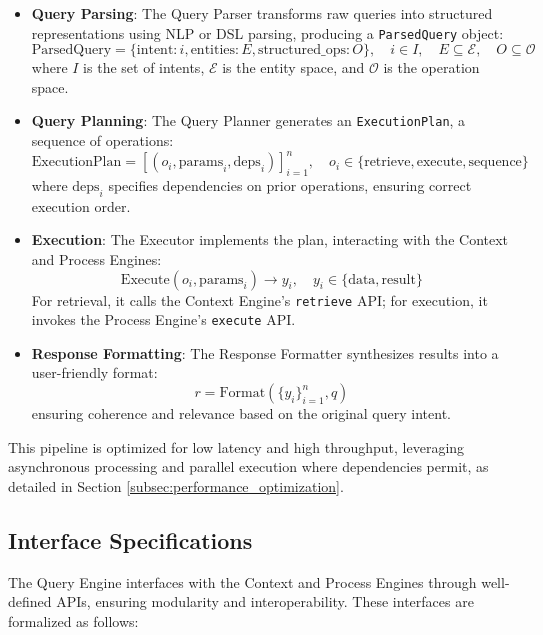 \documentclass[11pt]{article}
\begin{document}
\begin{itemize}
    \item \textbf{Query Parsing}: The Query Parser transforms raw queries into structured representations using NLP or DSL parsing, producing a \texttt{ParsedQuery} object:
        \[
        \text{ParsedQuery} = \{ \text{intent}: i, \text{entities}: E, \text{structured\_ops}: O \}, \quad i \in I, \quad E \subseteq \mathcal{E}, \quad O \subseteq \mathcal{O}
        \]
        where \( I \) is the set of intents, \( \mathcal{E} \) is the entity space, and \( \mathcal{O} \) is the operation space.

    \item \textbf{Query Planning}: The Query Planner generates an \texttt{ExecutionPlan}, a sequence of operations:
        \[
        \text{ExecutionPlan} = [ (o_i, \text{params}_i, \text{deps}_i) ]_{i=1}^n, \quad o_i \in \{ \text{retrieve}, \text{execute}, \text{sequence} \}
        \]
        where \( \text{deps}_i \) specifies dependencies on prior operations, ensuring correct execution order.

    \item \textbf{Execution}: The Executor implements the plan, interacting with the Context and Process Engines:
        \[
        \text{Execute}(o_i, \text{params}_i) \rightarrow y_i, \quad y_i \in \{ \text{data}, \text{result} \}
        \]
        For retrieval, it calls the Context Engine’s \texttt{retrieve} API; for execution, it invokes the Process Engine’s \texttt{execute} API.

    \item \textbf{Response Formatting}: The Response Formatter synthesizes results into a user-friendly format:
        \[
        r = \text{Format}( \{ y_i \}_{i=1}^n, q )
        \]
        ensuring coherence and relevance based on the original query intent.

\end{itemize}

This pipeline is optimized for low latency and high throughput, leveraging asynchronous processing and parallel execution where dependencies permit, as detailed in Section \ref{subsec:performance_optimization}.

\subsection{Interface Specifications}
\label{subsec:interfaces}

The Query Engine interfaces with the Context and Process Engines through well-defined APIs, ensuring modularity and interoperability. These interfaces are formalized as follows:
\end{document}
